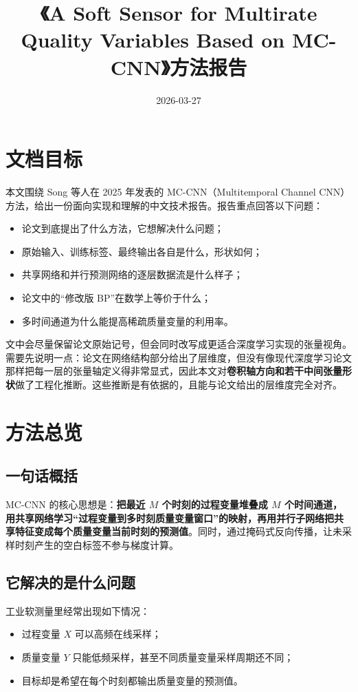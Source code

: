 \documentclass[UTF8]{ctexart}
\title{《A Soft Sensor for Multirate Quality Variables Based on MC-CNN》方法报告}
\author{}
\date{2026-03-27}
\begin{document}
\maketitle
\tableofcontents
\newpage

\section{文档目标}

本文围绕 Song 等人在 2025 年发表的 MC-CNN（Multitemporal Channel CNN）方法，给出一份面向实现和理解的中文技术报告。报告重点回答以下问题：
\begin{itemize}
    \item 论文到底提出了什么方法，它想解决什么问题；
    \item 原始输入、训练标签、最终输出各自是什么，形状如何；
    \item 共享网络和并行预测网络的逐层数据流是什么样子；
    \item 论文中的“修改版 BP”在数学上等价于什么；
    \item 多时间通道为什么能提高稀疏质量变量的利用率。
\end{itemize}

文中会尽量保留论文原始记号，但会同时改写成更适合深度学习实现的张量视角。需要先说明一点：论文在网络结构部分给出了层维度，但没有像现代深度学习论文那样把每一层的张量轴定义得非常显式，因此本文对\textbf{卷积轴方向和若干中间张量形状}做了工程化推断。这些推断是有依据的，且能与论文给出的层维度完全对齐。

\section{方法总览}

\subsection{一句话概括}

MC-CNN 的核心思想是：\textbf{把最近 $M$ 个时刻的过程变量堆叠成 $M$ 个时间通道，用共享网络学习“过程变量到多时刻质量变量窗口”的映射，再用并行子网络把共享特征变成每个质量变量当前时刻的预测值}。同时，通过掩码式反向传播，让未采样时刻产生的空白标签不参与梯度计算。

\subsection{它解决的是什么问题}

工业软测量里经常出现如下情况：
\begin{itemize}
    \item 过程变量 $X$ 可以高频在线采样；
    \item 质量变量 $Y$ 只能低频采样，甚至不同质量变量采样周期还不同；
    \item 目标却是希望在每个时刻都输出质量变量的预测值。
\end{itemize}
\end{document}
